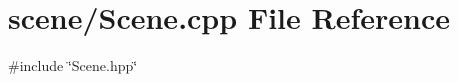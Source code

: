 \section{scene/\+Scene.cpp File Reference}
\label{_scene_8cpp}
{\ttfamily \#include \char`\"{}Scene.\+hpp\char`\"{}}\newline
